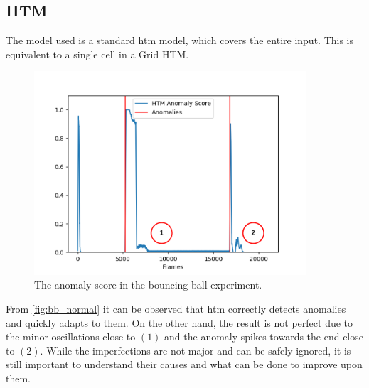 \subsection{HTM}
The model used is a standard \gls*{htm} model, which covers the entire input. This is equivalent to a single cell in a Grid HTM.
\begin{figure}[H]
    \centering
    \includegraphics[width=0.9\textwidth]{resources/experiments/bouncing_ball/bb_anoms_bad.png}
    \caption[Bouncing Ball Experiment Anomaly Score]{The anomaly score in the bouncing ball experiment.}
    \label{fig:bb_normal}
\end{figure}
From \autoref{fig:bb_normal} it can be observed that \gls*{htm} correctly detects anomalies and quickly adapts to them. On the other hand, the result is not perfect due to the minor oscillations close to $(1)$ and the anomaly spikes towards the end close to $(2)$. While the imperfections are not major and can be safely ignored, it is still important to understand their causes and what can be done to improve upon them. \par
